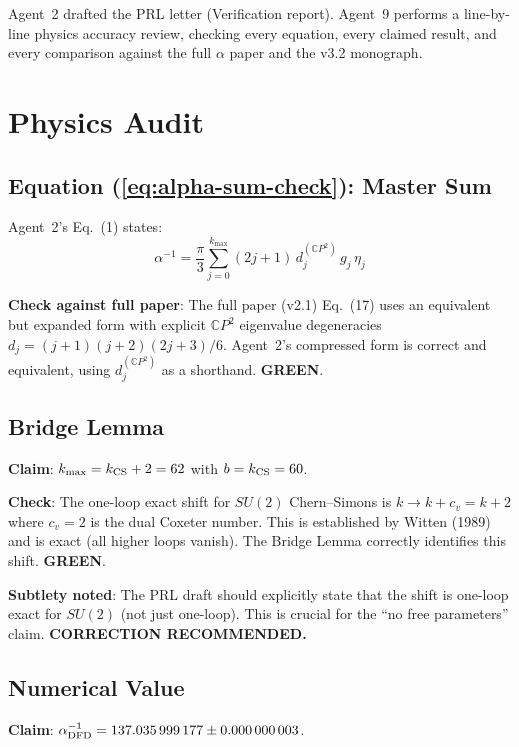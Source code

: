 \documentclass[11pt,a4paper]{article}
\newcommand{\GREEN}{\textcolor{dfdgreen}{\textbf{GREEN}}}
\newcommand{\CP}{\mathbb{C}P}
\begin{document}
Agent~2 drafted the PRL letter (Verification report). Agent~9 performs a line-by-line physics accuracy review, checking every equation, every claimed result, and every comparison against the full $\alpha$ paper and the v3.2 monograph.

\section{Physics Audit}

\subsection{Equation (\ref{eq:alpha-sum-check}): Master Sum}

Agent~2's Eq.~(1) states:
\begin{equation}
\alpha^{-1} = \frac{\pi}{3} \sum_{j=0}^{k_{\max}} (2j+1) \, d_j^{(\CP^2)} \, g_j \, \eta_j
\label{eq:alpha-sum-check}
\end{equation}

\textbf{Check against full paper}: The full paper (v2.1) Eq.~(17) uses an equivalent but expanded form with explicit $\CP^2$ eigenvalue degeneracies $d_j = (j+1)(j+2)(2j+3)/6$. Agent~2's compressed form is correct and equivalent, using $d_j^{(\CP^2)}$ as a shorthand. \GREEN.

\subsection{Bridge Lemma}

\textbf{Claim}: $k_{\max} = k_{\rm CS} + 2 = 62$ with $b = k_{\rm CS} = 60$.

\textbf{Check}: The one-loop exact shift for $SU(2)$ Chern--Simons is $k \to k + c_v = k + 2$ where $c_v = 2$ is the dual Coxeter number. This is established by Witten (1989) and is exact (all higher loops vanish). The Bridge Lemma correctly identifies this shift. \GREEN.

\textbf{Subtlety noted}: The PRL draft should explicitly state that the shift is one-loop exact for $SU(2)$ (not just one-loop). This is crucial for the ``no free parameters'' claim. \textbf{CORRECTION RECOMMENDED.}

\subsection{Numerical Value}

\textbf{Claim}: $\alpha^{-1}_{\rm DFD} = 137.035\,999\,177 \pm 0.000\,000\,003$.
\end{document}
